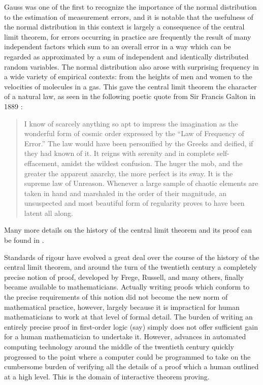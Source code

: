 \documentclass{article}
\theoremstyle{definition}
\begin{document}
Gauss was one of the first to recognize the importance of the normal distribution to the estimation of measurement errors, and it is notable that the usefulness of the normal distribution in this context is largely a consequence of the central limit theorem, for errors occurring in practice are frequently the result of many independent factors which sum to an overall error in a way which can be regarded as approximated by a sum of independent and identically distributed random variables. The normal distribution also arose with surprising frequency in a wide variety of empirical contexts: from the heights of men and women to the velocities of molecules in a gas. This gave the central limit theorem the character of a natural law, as seen in the following poetic quote from Sir Francis Galton in 1889 \cite{galton}:
\begin{quote}
 I know of scarcely anything so apt to impress the imagination as the wonderful form of cosmic order expressed by the ``Law of Frequency of Error.'' The law would have been personified by the Greeks and deified, if they had known of it. It reigns with serenity and in complete self-effacement, amidst the wildest confusion. The huger the mob, and the greater the apparent anarchy, the more perfect is its sway. It is the supreme law of Unreason. Whenever a large sample of chaotic elements are taken in hand and marshaled in the order of their magnitude, an unsuspected and most beautiful form of regularity proves to have been latent all along.
\end{quote}
Many more details on the history of the central limit theorem and its proof can be found in \cite{fischer}.

Standards of rigour have evolved a great deal over the course of the history of the central limit theorem, and around the turn of the twentieth century a completely precise notion of proof, developed by Frege, Russell, and many others, finally became available to mathematicians. Actually writing proofs which conform to the precise requirements of this notion did not become the new norm of mathematical practice, however, largely because it is impractical for human mathematicians to work at that level of formal detail. The burden of writing an entirely precise proof in first-order logic (say) simply does not offer sufficient gain for a human mathematician to undertake it. However, advances in automated computing technology around the middle of the twentieth century quickly progressed to the point where a computer could be programmed to take on the cumbersome burden of verifying all the details of a proof which a human outlined at a high level. This is the domain of interactive theorem proving.
\end{document}
